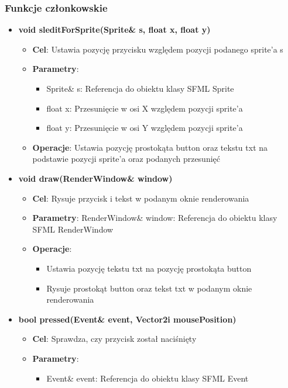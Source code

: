 \documentclass[a4paper, 10pt]{article}
\begin{document}
\subsubsection{Funkcje członkowskie}
\begin{itemize}
	\item \textbf{void sleditForSprite(Sprite\& s, float x, float y)}
		\begin{itemize}
			\item \textbf{Cel}: Ustawia pozycję przycisku względem pozycji podanego sprite'a s
			\item \textbf{Parametry}:
				\begin{itemize}
					\item Sprite\& s: Referencja do obiektu klasy SFML Sprite
					\item float x: Przesunięcie w osi X względem pozycji sprite'a
					\item float y: Przesunięcie w osi Y względem pozycji sprite'a
				\end{itemize}
			\item \textbf{Operacje}: Ustawia pozycję prostokąta button oraz tekstu txt na podstawie pozycji sprite'a oraz podanych przesunięć
		\end{itemize}
	\item \textbf{void draw(RenderWindow\& window)}
		\begin{itemize}
			\item \textbf{Cel}: Rysuje przycisk i tekst w podanym oknie renderowania
			\item \textbf{Parametry}: RenderWindow\& window: Referencja do obiektu klasy SFML RenderWindow
			\item \textbf{Operacje}:
				\begin{itemize}
					\item Ustawia pozycję tekstu txt na pozycję prostokąta button
					\item Rysuje prostokąt button oraz tekst txt w podanym oknie renderowania
				\end{itemize}
		\end{itemize}
	\item \textbf{bool pressed(Event\& event, Vector2i mousePosition)}
		\begin{itemize}
			\item \textbf{Cel}: Sprawdza, czy przycisk został naciśnięty
			\item \textbf{Parametry}:
				\begin{itemize}
					\item Event\& event: Referencja do obiektu klasy SFML Event

\end{itemize}
\end{itemize}
\end{itemize}
\end{document}

